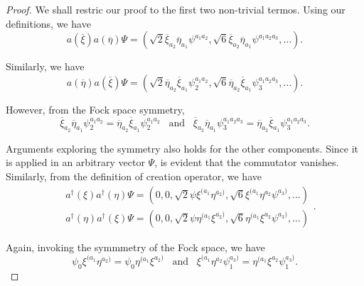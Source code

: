 \begin{proof}
    We shall restric our proof to the first two non-trivial termos. Using our definitions, we have
    \begin{equation}
        a(\overline{\xi})a(\overline{\eta})\Psi=\left(\sqrt{2}\overline{\xi}_{a_2}\overline{\eta}_{a_1}\psi^{a_1a_2},\sqrt{6}\overline{\xi}_{a_2}\overline{\eta}_{a_1}\psi^{a_1a_2a_3},\dots\right).
    \end{equation}

    Similarly, we have
    \begin{equation}
        a(\overline{\eta})a(\overline{\xi})\Psi=\left(\sqrt{2}\overline{\eta}_{a_2}\overline{\xi}_{a_1}\psi_2^{a_1a_2},\sqrt{6}\overline{\eta}_{a_2}\overline{\xi}_{a_1}\psi_3^{a_1a_2a_3},\dots\right).
    \end{equation}

    However, from the Fock space symmetry,
    \begin{equation}
        \overline{\xi}_{a_2}\overline{\eta}_{a_1}\psi_2^{a_1a_2}=\overline{\eta}_{a_2}\overline{\xi}_{a_1}\psi_2^{a_1a_2}\;\;\;\text{and}\;\;\;\overline{\xi}_{a_2}\overline{\eta}_{a_1}\psi_3^{a_1a_2a_3}=\overline{\eta}_{a_2}\overline{\xi}_{a_1}\psi_3^{a_1a_2a_3}.
    \end{equation}

    Arguments exploring the symmetry also holds for the other components. Since it is applied in an arbitrary vector \(\Psi\), is evident that the commutator vanishes. 
    Similarly, from the definition of creation operator, we have
    \begin{equation}
        \begin{aligned}
            &a^{\dagger}(\xi)a^{\dagger}(\eta)\Psi=\left(0,0,\sqrt{2}\psi\xi^{(a_1}\eta^{a_2)},\sqrt{6}\xi^{(a_1}\eta^{a_2}\psi^{a_3)},\dots\right)\\
            &a^{\dagger}(\eta)a^{\dagger}(\xi)\Psi=\left(0,0,\sqrt{2}\psi\eta^{(a_1}\xi^{a_2)},\sqrt{6}\eta^{(a_1}\xi^{a_2}\psi^{a_3)},\dots\right)
        \end{aligned}.
    \end{equation}

    Again, invoking the symmmetry of the Fock space, we have
    \begin{equation}
        \psi_0\xi^{(a_1}\eta^{a_2)}=\psi_0\eta^{(a_1}\xi^{a_2)}\;\;\;\text{and}\;\;\;\xi^{(a_1}\eta^{a_2}\psi_1^{a_3)}=\eta^{(a_1}\xi^{a_2}\psi_1^{a_3)}.
    \end{equation}


\end{proof}
